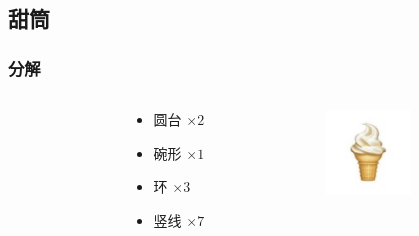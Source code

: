 \documentclass[aspectratio=169]{ctexbeamer} %
\begin{document}
\subsection{甜筒}
\begin{frame}
    \frametitle{分解} %
    \begin{columns}
    \begin{column}{.1\textwidth}\end{column}
        \begin{column}{.4\textwidth}
            \begin{itemize}
                \item 圆台 $\times 2$
                \item 碗形 $\times 1$
                \item 环 $\times 3$
                \item 竖线 $\times 7$
            \end{itemize}
        \end{column}
        \begin{column}{.5\textwidth}
            \includegraphics[width=64pt]{images/pre/emoji.pdf}
        \end{column}
    \end{columns}
\end{frame}
\end{document}
